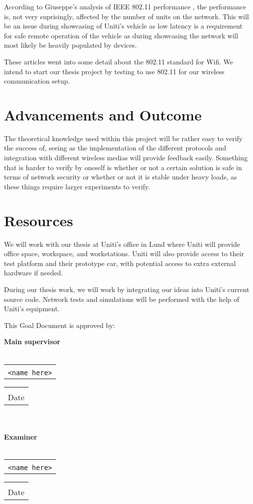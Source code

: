 \documentclass[a4paper]{article}
\makeatletter
\newcommand{\signature}[2]{%
	\noindent%
	\textbf{{#1}}\\\\
	\begin{tabular}{@{}p{2.5in}@{}}
		\\ \hline \\[-.75\normalbaselineskip]
		\texttt{{#2}}
	\end{tabular} \hspace{0in}
	\begin{tabular}{@{}p{2.5in}@{}}
		\\ \hline \\[-.75\normalbaselineskip]
		Date
	\end{tabular}\\
}
\makeatother
\begin{document}
According to Giuseppe's analysis of IEEE 802.11 performance
\cite{PAIEEE_article}, the performance is, not very suprisingly, affected by the
number of units on the network. This will be an issue during showcasing of
Uniti's vehicle as low latency is a requirement for safe remote operation of the
vehicle as during showcasing the network will most likely be heavily populated
by devices.

These articles went into some detail about the 802.11 standard for Wifi.
We intend to start our thesis project by testing to use 802.11 for our 
wireless communication setup.



\section{Advancements and Outcome}
The theoretical knowledge used within this project will be rather easy
to verify the success of, seeing as the implementation of the different 
protocols and integration with different wireless medias will provide
feedback easily. Something that is harder to verify by oneself is whether
or not a certain solution is safe in terms of network security or whether
or not it is stable under heavy loads, as these things require larger
experiments to verify.

\section{Resources}
We will work with our thesis at Uniti's office in Lund where Uniti will provide
office space, workspace, and workstations. Uniti will also provide access to
their test platform and their prototype car, with potential access to extra
external hardware if needed.

During our thesis work, we will work by integrating our ideas into Uniti's
current source code.
Network tests and simulations will be performed with the help of Uniti's
equipment.

{}



This Goal Document is approved by:

\signature{Main supervisor}{<name here>}\\

\signature{Examiner}{<name here>}
\end{document}
